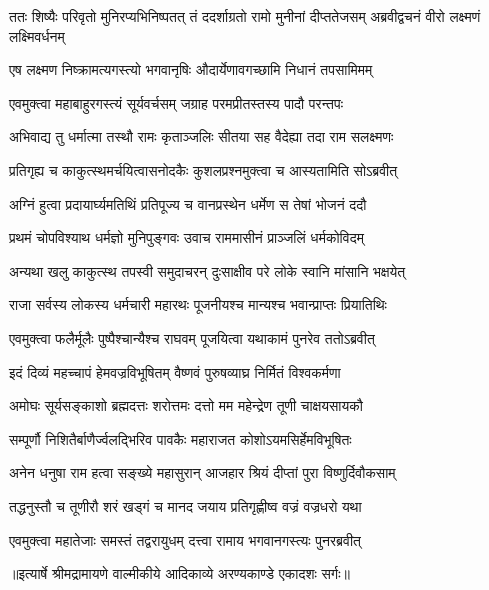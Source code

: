 \threelineshloka
{ततः शिष्यैः परिवृतो मुनिरप्यभिनिष्पतत्}
{तं ददर्शाग्रतो रामो मुनीनां दीप्ततेजसम्}
{अब्रवीद्वचनं वीरो लक्ष्मणं लक्ष्मिवर्धनम्} %

\twolineshloka
{एष लक्ष्मण निष्क्रामत्यगस्त्यो भगवानृषिः}
{औदार्येणावगच्छामि निधानं तपसामिमम्} %

\twolineshloka
{एवमुक्त्वा महाबाहुरगस्त्यं सूर्यवर्चसम्}
{जग्राह परमप्रीतस्तस्य पादौ परन्तपः} %

\twolineshloka
{अभिवाद्य तु धर्मात्मा तस्थौ रामः कृताञ्जलिः}
{सीतया सह वैदेह्या तदा राम सलक्ष्मणः} %

\twolineshloka
{प्रतिगृह्य च काकुत्स्थमर्चयित्वासनोदकैः}
{कुशलप्रश्नमुक्त्वा च आस्यतामिति सोऽब्रवीत्} %

\twolineshloka
{अग्निं हुत्वा प्रदायार्घ्यमतिथिं प्रतिपूज्य च}
{वानप्रस्थेन धर्मेण स तेषां भोजनं ददौ} %

\twolineshloka
{प्रथमं चोपविश्याथ धर्मज्ञो मुनिपुङ्गवः}
{उवाच राममासीनं प्राञ्जलिं धर्मकोविदम्} %

\twolineshloka
{अन्यथा खलु काकुत्स्थ तपस्वी समुदाचरन्}
{दुःसाक्षीव परे लोके स्वानि मांसानि भक्षयेत्} %

\twolineshloka
{राजा सर्वस्य लोकस्य धर्मचारी महारथः}
{पूजनीयश्च मान्यश्च भवान्प्राप्तः प्रियातिथिः} %

\twolineshloka
{एवमुक्त्वा फलैर्मूलैः पुष्पैश्चान्यैश्च राघवम्}
{पूजयित्वा यथाकामं पुनरेव ततोऽब्रवीत्} %

\twolineshloka
{इदं दिव्यं महच्चापं हेमवज्रविभूषितम्}
{वैष्णवं पुरुषव्याघ्र निर्मितं विश्वकर्मणा} %

\twolineshloka
{अमोघः सूर्यसङ्काशो ब्रह्मदत्तः शरोत्तमः}
{दत्तो मम महेन्द्रेण तूणी चाक्षयसायकौ} %

\twolineshloka
{सम्पूर्णौ निशितैर्बाणैर्ज्वलद्भिरिव पावकैः}
{महाराजत कोशोऽयमसिर्हेमविभूषितः} %

\twolineshloka
{अनेन धनुषा राम हत्वा सङ्ख्ये महासुरान्}
{आजहार श्रियं दीप्तां पुरा विष्णुर्दिवौकसाम्} %

\twolineshloka
{तद्धनुस्तौ च तूणीरौ शरं खड्गं च मानद}
{जयाय प्रतिगृह्णीष्व वज्रं वज्रधरो यथा} %

\twolineshloka
{एवमुक्त्वा महातेजाः समस्तं तद्वरायुधम्}
{दत्त्वा रामाय भगवानगस्त्यः पुनरब्रवीत्} %


{॥इत्यार्षे श्रीमद्रामायणे वाल्मीकीये आदिकाव्ये अरण्यकाण्डे एकादशः सर्गः॥}


